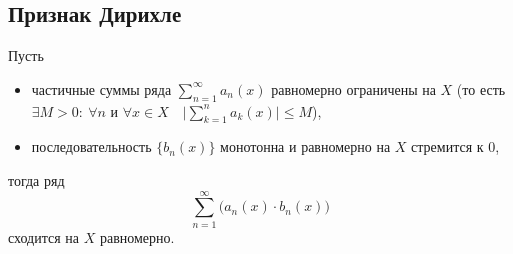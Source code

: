 \subsection{Признак Дирихле}

\begin{theorem}
    Пусть
    \begin{itemize}
        \item частичные суммы ряда $\sum_{n=1}^{\infty}a_n(x)$ равномерно ограничены на $X$ (то есть $\exists M > 0: \ \forall n$ и $\forall x \in X \quad \big|\sum_{k=1}^{n}a_k(x)\big| \leqslant M$),
        \item последовательность $ \big\{b_n(x)\big\} $ монотонна и равномерно на $ X $ стремится к $ 0 $,
    \end{itemize}
    тогда ряд
    \[
        \sum_{n=1}^{\infty}\big(a_n(x) \cdot b_n(x)\big)
    \]
    сходится на $X$ равномерно.
\end{theorem}
